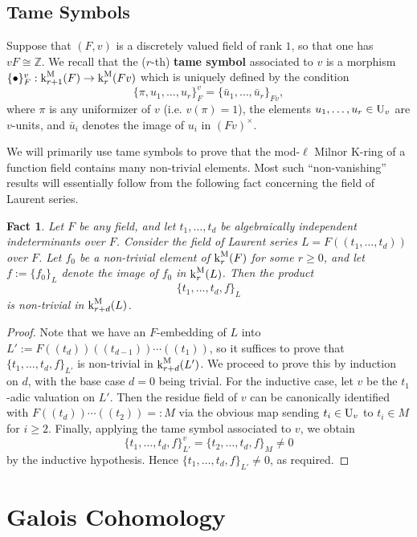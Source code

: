 \documentclass[11pt]{amsart}
\newtheorem{fact}[proposition]{Fact}
\theoremstyle{definition}
\theoremstyle{remark}
\numberwithin{equation}{section}
\newcommand{\Z}{\mathbb{Z}}
\newcommand{\U}{{\rm U}}
\renewcommand{\k}{\operatorname{k}^{\rm M}}
\begin{document}
\subsection{Tame Symbols}
\label{subsection: milnor / tame}

Suppose that $(F,v)$ is a discretely valued field of rank $1$, so that one has $vF \cong \Z$.
We recall that the ($r$-th) {\bf tame symbol} associated to $v$ is a morphism $\{\bullet\}^v_F : \k_{r+1}(F) \rightarrow \k_r(Fv)$ which is uniquely defined by the condition
\[ \{\pi,u_1,\ldots,u_r\}_F^v = \{\bar u_1,\ldots,\bar u_r\}_{Fv}, \]
where $\pi$ is any uniformizer of $v$ (i.e. $v(\pi) = 1$), the elements $u_1,\ldots,u_r \in \U_v$ are $v$-units, and $\bar u_i$ denotes the image of $u_i$ in $(Fv)^\times$.

We will primarily use tame symbols to prove that the mod-$\ell$ Milnor K-ring of a function field contains many non-trivial elements.
Most such ``non-vanishing'' results will essentially follow from the following fact concerning the field of Laurent series.

\begin{fact}
\label{fact: milnor / tame / laurent-coords}
  Let $F$ be any field, and let $t_1,\ldots,t_d$ be algebraically independent indeterminants over $F$.
  Consider the field of Laurent series $L = F((t_1,\ldots,t_d))$ over $F$.
  Let $f_0$ be a non-trivial element of $\k_r(F)$ for some $r \geq 0$, and let $f := \{f_0\}_L$ denote the image of $f_0$ in $\k_r(L)$.
  Then the product
  \[ \{t_1,\ldots,t_d,f\}_L \]
  is non-trivial in $\k_{r+d}(L)$.
\end{fact}
\begin{proof}
  Note that we have an $F$-embedding of $L$ into $L' := F((t_d))((t_{d-1}))\cdots((t_1))$, so it suffices to prove that $\{t_1,\ldots,t_d,f\}_{L'}$ is non-trivial in $\k_{r+d}(L')$.
  We proceed to prove this by induction on $d$, with the base case $d = 0$ being trivial.
  For the inductive case, let $v$ be the $t_1$-adic valuation on $L'$.
  Then the residue field of $v$ can be canonically identified with $F((t_d))\cdots((t_2)) =: M$ via the obvious map sending $t_i \in \U_v$ to $t_i \in M$ for $i \geq 2$.
  Finally, applying the tame symbol associated to $v$, we obtain
  \[ \{t_1,\ldots,t_d,f\}_{L'}^v = \{t_2,\ldots,t_d,f\}_M \neq 0 \]
  by the inductive hypothesis.
  Hence $\{t_1,\ldots,t_d,f\}_{L'} \neq 0$, as required.
\end{proof}


\section{Galois Cohomology}
\label{section: cohom}
\end{document}

